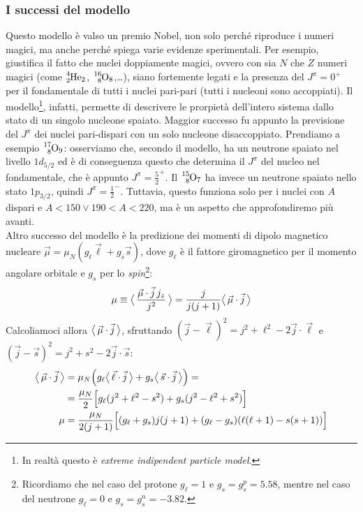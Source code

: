 \subsubsection{I successi del modello} 
Questo modello è valso un premio Nobel, non solo perché riproduce i numeri magici, ma anche perché spiega varie evidenze sperimentali. Per esempio, giustifica il fatto che nuclei doppiamente magici, ovvero con sia $N$ che $Z$ numeri magici (come $\ce{^4_2He_2}$, $\ce{^{16}_8O_8}$,\dots), siano fortemente legati e la presenza del $J^\pi = 0^+$ per il fondamentale di tutti i nuclei pari-pari (tutti i nucleoni sono accoppiati). Il modello\footnote{In realtà questo è \textit{extreme indipendent particle model}.}, infatti, permette di descrivere le prorpietà dell'intero sistema dallo stato di un singolo nucleone spaiato.
Maggior successo fu appunto la previsione del $J^\pi$ dei nuclei pari-dispari con un solo nucleone disaccoppiato. Prendiamo a esempio $\ce{^{17}_8O_9}$: osserviamo che, secondo il modello, ha un neutrone spaiato nel livello $1d_{5/2}$ ed è di conseguenza questo che determina il $J^\pi$ del nucleo nel fondamentale, che è appunto $J^\pi=\frac{5}{2}^+$. Il $\ce{^15_8O_7}$ ha invece un neutrone spaiato nello stato $1p_{3/2}$, quindi $J^\pi = \frac{1}{2}^-$. Tuttavia, questo funziona solo per i nuclei con $A$ dispari e $A<150 \vee 190<A<220$, ma è un aspetto che approfondiremo più avanti.\\
Altro successo del modello è la predizione dei momenti di dipolo magnetico nucleare $\vec{\mu} = \mu_N (g_\ell \vec{\ell}+g_s \vec{s})$, dove $g_\ell$ è il fattore giromagnetico per il momento angolare orbitale e $g_s$ per lo \textit{spin}\footnote{Ricordiamo che nel caso del protone $g_\ell = 1$ e $g_s=g_s^p = 5.58$, mentre nel caso del neutrone $g_\ell = 0$ e $g_s=g_s^n = -3.82$.}:
$$\mu \equiv \bigl\langle\, \frac{\vec{\mu}\cdot\vec{j}\, j_z}{j^2}\, \bigr\rangle = \frac{j}{j(j+1)}\bigl\langle\, \vec{\mu}\cdot\vec{j}\, \bigr\rangle$$
Calcoliamoci allora $\bigl\langle\, \vec{\mu}\cdot\vec{j}\, \bigr\rangle$, sfruttando $(\vec{j}-\vec{\ell})^2 = j^2 + \ell^2 -2\vec{j}\cdot\vec{\ell}$ e $(\vec{j}-\vec{s})^2 = j^2 + s^2 - 2\vec{j}\cdot\vec{s}$:
\begin{displaymath}
\begin{aligned}
\bigl\langle\, \vec{\mu}\cdot\vec{j}\, \bigr\rangle &= \mu_N \Bigl (g_\ell \bigl\langle\, \vec{\ell}\cdot\vec{j}\, \bigr\rangle +g_s \bigl\langle\, \vec{s}\cdot\vec{j}\, \bigr\rangle \Bigr ) = \\
&= \frac{\mu_N}{2} \Bigl [g_\ell (j^2 + \ell^2 - s^2) + g_s (j^2-\ell^2+s^2) \Bigr ] \\
\mu &= \frac{\mu_N}{2(j+1)} \Bigl [(g_\ell+g_s) j(j+1) + (g_\ell-g_s) (\ell(\ell+1)-s(s+1)) \Bigr ]
\end{aligned}
\end{displaymath}
